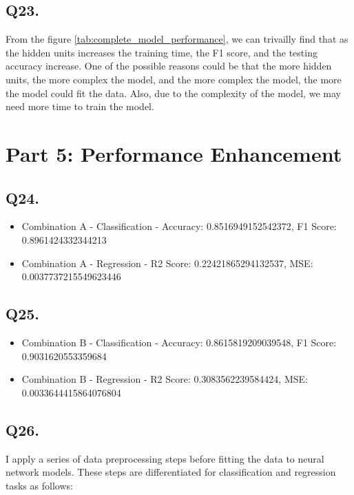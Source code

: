 \documentclass{article}
\begin{document}
\subsection*{Q23.}

From the figure \ref{tab:complete_model_performance}, we can trivailly find that as the hidden units increases the training time, the F1 score, and the testing accuracy increase.
One of the possible reasons could be that the more hidden units, the more complex the model, and the more complex the model, the more the model could fit the data.
Also, due to the complexity of the model, we may need more time to train the model.

\newpage

\section*{Part 5: Performance Enhancement}

\subsection*{Q24.}
\begin{itemize}
    \item Combination A - Classification - Accuracy: 0.8516949152542372, F1 Score: 0.8961424332344213
    \item Combination A - Regression - R2 Score: 0.22421865294132537, MSE: 0.0037737215549623446
\end{itemize}

\subsection*{Q25.}
\begin{itemize}
    \item Combination B - Classification - Accuracy: 0.8615819209039548, F1 Score: 0.9031620553359684
    \item Combination B - Regression - R2 Score: 0.3083562239584424, MSE: 0.0033644415864076804
\end{itemize}

\subsection*{Q26.}


I apply a series of data preprocessing steps before fitting the data to neural network models. These steps are differentiated for classification and regression tasks as follows:
\end{document}
